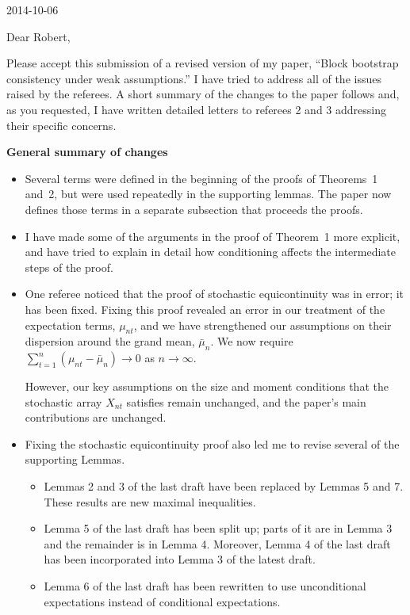\documentclass[12pt]{article}
\begin{document}
\hfill 2014-10-06

\noindent
Dear Robert,

Please accept this submission of a revised version of my paper,
``Block bootstrap consistency under weak assumptions.'' I have tried to
address all of the issues raised by the referees. A short summary of
the changes to the paper follows and, as you requested, I have
written detailed letters to referees 2 and 3 addressing their specific
concerns.

\strut

\noindent \textbf{General summary of changes}

\begin{itemize}
\item Several terms were defined in the beginning of the proofs of
  Theorems~1 and~2, but were used repeatedly in the supporting
  lemmas. The paper now defines those terms in a separate subsection
  that proceeds the proofs.

\item I have made some of the arguments in the proof of Theorem~1 more
  explicit, and have tried to explain in detail how conditioning
  affects the intermediate steps of the proof.

\item One referee noticed that the proof of stochastic equicontinuity
  was in error; it has been fixed. Fixing this proof revealed an error
  in our treatment of the expectation terms, $\mu_{nt}$, and we have
  strengthened our assumptions on their dispersion around the grand
  mean, $\bar \mu_n$. We now require
  $\sum_{t=1}^n (\mu_{nt} - \bar \mu_n) \to 0$
  as $n \to \infty$.

  However, our key assumptions on the size and moment conditions that
  the stochastic array $X_{nt}$ satisfies remain unchanged, and the
  paper's main contributions are unchanged.

\item Fixing the stochastic equicontinuity proof also led me to revise
  several of the supporting Lemmas.
  \begin{itemize}
  \item Lemmas 2 and 3 of the last draft have been replaced by Lemmas
    5 and 7. These results are new maximal inequalities.
  \item Lemma 5 of the last draft has been split up; parts of it are
    in Lemma 3 and the remainder is in Lemma 4. Moreover, Lemma 4 of
    the last draft has been incorporated into Lemma 3 of the latest draft.
  \item Lemma 6 of the last draft has been rewritten to use
    unconditional expectations instead of conditional expectations.
  \end{itemize}


\end{itemize}
\end{document}
